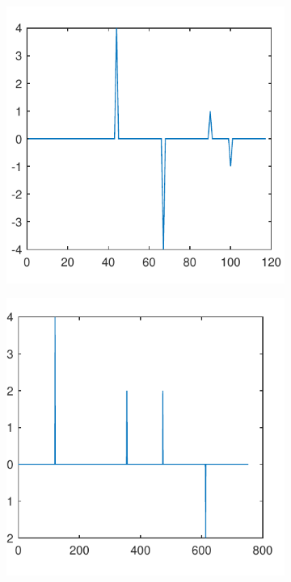 \documentclass[sigconf]{acmart}
\begin{document}
	\begin{figure}[!htp]
		\centering
		\begin{subfigure}[t]{0.45\linewidth}
			\centering
			\includegraphics[width=0.95\linewidth]{fig/route_change_8}
			\label{fig:3.2a}
		\end{subfigure}
		\begin{subfigure}[t]{0.45\linewidth}
			\centering
			\includegraphics[width=0.95\linewidth]{fig/route_change_20}

\end{subfigure}
\end{figure}
\end{document}
